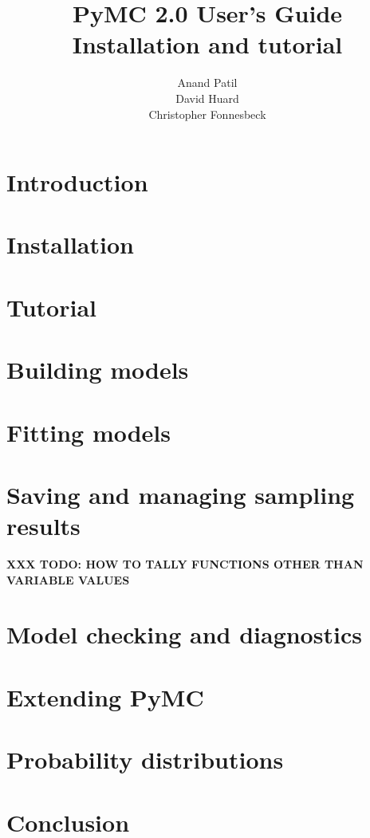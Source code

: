 \documentclass[]{manual}
\title{PyMC 2.0 User's Guide \\
Installation and tutorial}
\author{Anand Patil \\ David Huard \\ Christopher Fonnesbeck}
\begin{document}
\maketitle

\tableofcontents

\chapter{Introduction}
\label{chap:intro}


\chapter{Installation}
\label{chap:install}


\chapter{Tutorial}
\label{chap:tutorial}


\chapter{Building models}
\label{chap:modelbuilding}


\chapter{Fitting models}
\label{chap:modelfitting}


\chapter{Saving and managing sampling results}
\label{chap:database}
\textbf{XXX TODO: HOW TO TALLY FUNCTIONS OTHER THAN VARIABLE VALUES}


\chapter{Model checking and diagnostics}
\label{chap:modelchecking}


\chapter{Extending PyMC}
\label{chap:extending}


\chapter{Probability distributions}
\label{chap:distributions}


\chapter{Conclusion}
\label{chap:conclusion}


% 

\nocite{Bernardo:1992fk}


\end{document}
